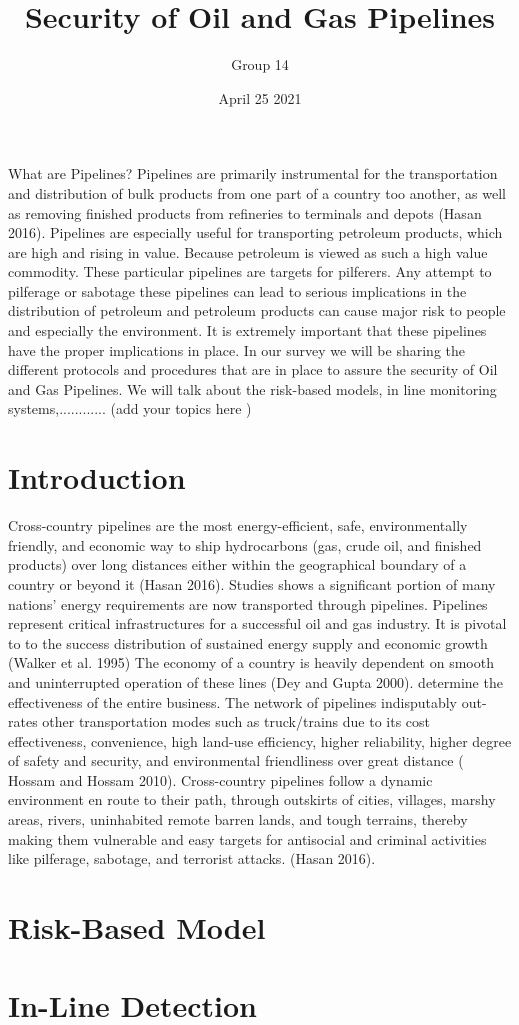 \documentclass{article}
\title{Security of Oil and Gas Pipelines}
\author{Group 14}
\date{April 25 2021}
\begin{document}
 What are Pipelines? Pipelines are primarily instrumental for the transportation and distribution of bulk products from one part of a country too another,  as well as removing finished products from refineries to terminals and depots (Hasan 2016). Pipelines are especially useful for transporting petroleum products, which are high and rising in value. Because petroleum is viewed as such a high value commodity. These particular pipelines are targets for pilferers. Any attempt to pilferage or sabotage these pipelines can lead to serious implications in the distribution of petroleum and petroleum products can cause major risk to people and especially the environment. It is extremely important that these pipelines have the proper implications in place. In our survey we will be sharing the different protocols and procedures that are in place to assure the security  of Oil and Gas Pipelines. We will talk about the risk-based models, in line monitoring systems,............ (add your topics here )

\section{Introduction}
Cross-country pipelines are the most energy-efficient, safe, environmentally friendly, and economic way to ship hydrocarbons (gas, crude oil, and finished products) over long distances either within the geographical boundary of a country or beyond it (Hasan 2016). Studies shows a significant portion of many nations' energy requirements are now transported through pipelines. Pipelines represent critical infrastructures for a successful oil and gas industry. It is pivotal to to the success distribution of sustained energy supply and economic growth (Walker et al. 1995) The economy of a country is heavily dependent on smooth and uninterrupted operation of these lines (Dey and Gupta 2000). determine the effectiveness of the entire business. The network of pipelines indisputably out-rates other transportation modes such as truck/trains due to its cost effectiveness, convenience, high land-use efficiency, higher reliability, higher degree of safety and security, and environmental friendliness over great distance ( Hossam and Hossam 2010). Cross-country pipelines follow a dynamic environment en route to their path, through outskirts of cities, villages, marshy areas, rivers, uninhabited remote barren lands, and tough terrains, thereby making them vulnerable and easy targets for antisocial and criminal activities like pilferage, sabotage, and terrorist attacks. (Hasan 2016). 

\section{Risk-Based Model}

\section{In-Line Detection}
\end{document}
